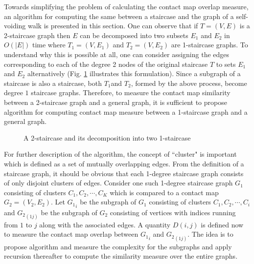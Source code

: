 Towards simplifying the problem of calculating the contact map overlap measure, an algorithm for computing the same between a staircase and the graph of a self-voiding walk is presented in this section. One can observe that if $T=(V,E)$ is a 2-staircase graph then $E$ can be decomposed into two subsets $E_{1}$ and $E_{2}$ in $O(|E|)$ time where $T_{1}=(V,E_{1})$ and $T_{2}=(V,E_{2})$ are 1-staircase graphs. To understand why this is possible at all, one can consider assigning the edges corresponding to each of the degree 2 nodes of the original staircase $T$ to sets
$E_{1}$ and $E_{2}$ alternatively (Fig. \ref{fig:staircasedecompisition} illustrates this formulation). Since a subgraph of a staircase is also a staircase, both $T_{1}$and $T_{2}$, formed by the above process, become degree $1$ staircase graphs. Therefore, to measure the contact map similarity between a 2-staircase graph and a general graph, it is sufficient to propose algorithm for computing contact map measure between a 1-staircase graph and a general graph.

\begin{figure}[htbp]
\begin{minipage}[b]{0.33\linewidth}
\centering
 
 \vspace{0.65cm}
\end{minipage}
\begin{minipage}[b]{0.33\linewidth}
\centering
 
 \vspace{0.65cm}
\end{minipage}
\begin{minipage}[b]{0.33\linewidth}
\centering
 
 \vspace{0.65cm}
\end{minipage}
\caption{A 2-staircase and its decomposition into two 1-staircase}
 \label{fig:staircasedecompisition}
\end{figure}


For further description of the algorithm, the concept of ``cluster" is important which is defined as a set of mutually overlapping edges. From the definition of a staircase graph, it should be obvious that each 1-degree staircase graph consists of only disjoint clusters of edges. Consider one such 1-degree staircase graph $G_1$ consisting of clusters $C_{1}, C_{2}, \cdots, C_{K}$ which is compared to a contact map $G_2=(V_2,E_2)$. Let ${G_1}_{i}$ be the subgraph of $G_1$ consisting of clusters $C_{1}, C_{2}, \cdots, C_{i}$ and ${G_2}_{(1j)}$ be the subgraph of $G_2$ consisting of vertices with indices running from $1$ to $j$ along with the associated edges. A quantity $D(i,j)$ is defined
now to measure the contact map overlap between ${G_1}_{i}$ and ${G_2}_{(1j)}$. The idea is to propose algorithm and measure the complexity for the subgraphs and apply recursion thereafter to compute the similarity measure over the entire graphs.

